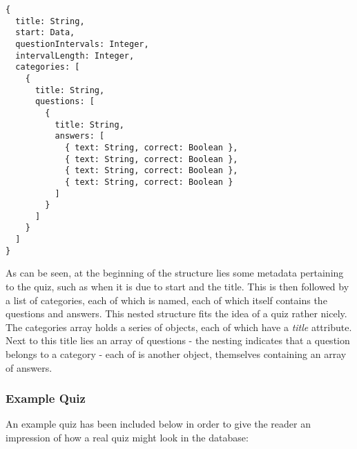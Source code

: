 \begin{Verbatim}[fontsize=\small]
{
  title: String,
  start: Data,
  questionIntervals: Integer,
  intervalLength: Integer,
  categories: [
    {
      title: String,
      questions: [
        {
          title: String,
          answers: [
            { text: String, correct: Boolean },
            { text: String, correct: Boolean },
            { text: String, correct: Boolean },
            { text: String, correct: Boolean }
          ]
        }
      ]
    }
  ]
}
\end{Verbatim}

As can be seen, at the beginning of the structure lies some metadata pertaining to the quiz, such as when it is due to start and the title. This is then followed by a list of categories, each of which is named, each of which itself contains the questions and answers. This nested structure fits the idea of a quiz rather nicely. The categories array holds a series of objects, each of which have a \textit{title} attribute. Next to this title lies an array of questions - the nesting indicates that a question belongs to a category - each of is another object, themselves containing an array of answers.

\subsubsection{Example Quiz}
An example quiz has been included below in order to give the reader an impression of how a real quiz might look in the database:

